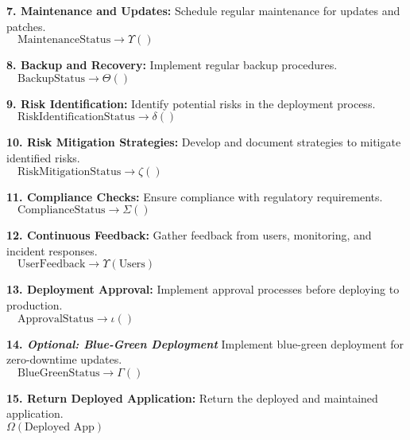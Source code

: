 \documentclass[12pt, letterpaper]{article}
\begin{document}
\begin{algorithm}[h!]
\begin{algorithmic}[1]
        \State \textbf{7. Maintenance and Updates:}
        \State \quad Schedule regular maintenance for updates and patches. \\
        $ \quad \text{MaintenanceStatus} \xrightarrow{} \Upsilon()$ 

        \State \textbf{8. Backup and Recovery:}
        \State \quad Implement regular backup procedures. \\
        $ \quad \text{BackupStatus} \xrightarrow{} \Theta()$ 

        \State \textbf{9. Risk Identification:}
        \State \quad Identify potential risks in the deployment process. \\
        $ \quad \text{RiskIdentificationStatus} \xrightarrow{} \delta()$ 

        \State \textbf{10. Risk Mitigation Strategies:}
        \State \quad Develop and document strategies to mitigate identified risks. \\
        $ \quad \text{RiskMitigationStatus} \xrightarrow{} \zeta()$ 

        \State \textbf{11. Compliance Checks:}
        \State \quad Ensure compliance with regulatory requirements. \\
        $ \quad \text{ComplianceStatus} \xrightarrow{} \Sigma()$ 

        \State \textbf{12. Continuous Feedback:}
        \State \quad Gather feedback from users, monitoring, and incident responses. \\
        $ \quad \text{UserFeedback} \xrightarrow{} \Upsilon(\text{Users})$ 

        \State \textbf{13. Deployment Approval:}
        \State \quad Implement approval processes before deploying to production. \\
        $ \quad \text{ApprovalStatus} \xrightarrow{} \iota()$ 

        \State \textbf{14. \textit{Optional: Blue-Green Deployment}}
        \State \quad Implement blue-green deployment for zero-downtime updates. \\
        $ \quad \text{BlueGreenStatus} \xrightarrow{} \Gamma()$ 

        \State \textbf{15. Return Deployed Application:}
        \State \quad Return the deployed and maintained application. \\
        \Return $\Omega(\text{Deployed App})$ 
        \EndProcedure
    \end{algorithmic}
\end{algorithm}
\end{document}
